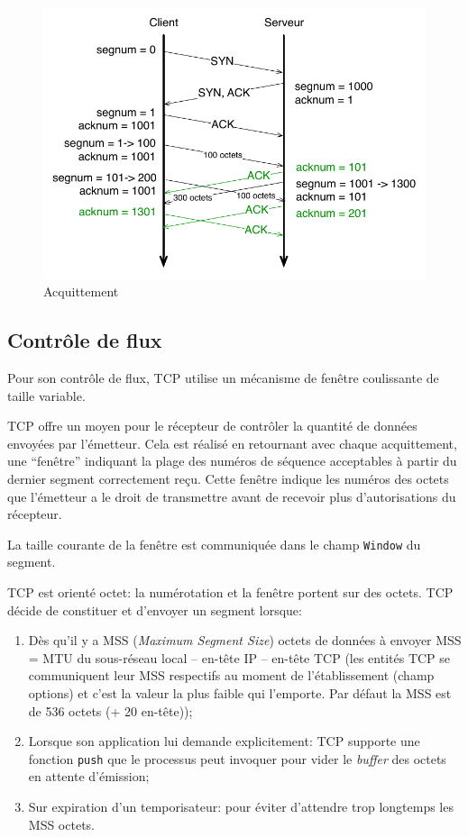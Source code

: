 \documentclass[11pt,english,french]{scrreprt}
\theoremstyle{remark}
\theoremstyle{definition}
\begin{document}
\begin{figure}[h!]
	\center
	\includegraphics[scale=.75]{graphes/TCP/Acquittement}
	\caption{Acquittement}
\end{figure}

\subsection{Contrôle de flux} %

Pour son contrôle de flux, TCP utilise un mécanisme de fenêtre coulissante de taille variable.

TCP offre un moyen pour le récepteur de contrôler la quantité de données envoyées par l'émetteur. Cela est réalisé en retournant avec chaque acquittement, une “fenêtre” indiquant la plage des numéros de séquence acceptables à partir du dernier segment correctement reçu. Cette fenêtre indique les numéros des octets que l'émetteur a le droit de transmettre avant de recevoir plus d'autorisations du récepteur.

La taille courante de la fenêtre est communiquée dans le champ \lstinline!Window! du segment.

TCP est orienté octet: la numérotation et la fenêtre portent sur des octets. TCP décide de constituer et d'envoyer un segment lorsque:\begin{enumerate}
	\item Dès qu'il y a MSS (\emph{Maximum Segment Size}) octets de données à envoyer MSS = MTU du sous-réseau local -- en-tête IP -- en-tête TCP (les entités TCP se communiquent leur MSS respectifs au moment de l'établissement (champ options) et c'est la valeur la plus faible qui l'emporte. Par défaut la MSS est de 536 octets (+ 20 en-tête));
	\item Lorsque son application lui demande explicitement: TCP supporte une fonction \lstinline!push! que le processus peut invoquer pour vider le \emph{buffer} des octets en attente d'émission;
	\item Sur expiration d'un temporisateur: pour éviter d'attendre trop longtemps les MSS octets.
\end{enumerate}
\end{document}
